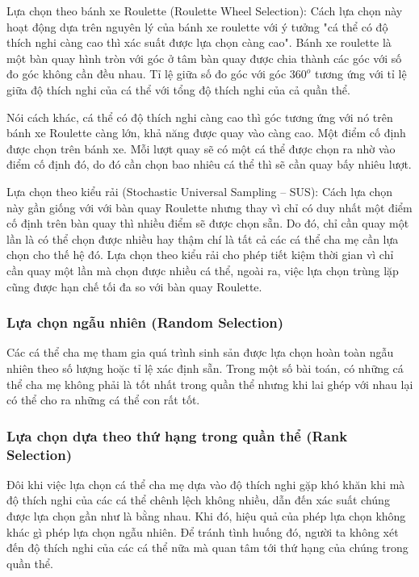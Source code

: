 Lựa chọn theo bánh xe Roulette (Roulette Wheel Selection): Cách lựa chọn này hoạt động dựa trên nguyên lý của bánh xe roulette với ý tưởng "cá thể có độ thích nghi càng cao thì xác suất được lựa chọn càng cao". Bánh xe roulette là một bàn quay hình tròn với góc ở tâm bàn quay được chia thành các góc với số đo góc không cần đều nhau. Tỉ lệ giữa số đo góc với góc $360^o$ tương ứng với tỉ lệ giữa độ thích nghi của cá thể với tổng độ thích nghi của cả quần thể.

Nói cách khác, cá thể có độ thích nghi càng cao thì góc tương ứng với nó trên bánh xe Roulette càng lớn, khả năng được quay vào càng cao. Một điểm cố định được chọn trên bánh xe. Mỗi lượt quay sẽ có một cá thể được chọn ra nhờ vào điểm cố định đó, do đó cần chọn bao nhiêu cá thể thì sẽ cần quay bấy nhiêu lượt.

Lựa chọn theo kiểu rải (Stochastic Universal Sampling – SUS): Cách lựa chọn này gần giống với với bàn quay Roulette nhưng thay vì chỉ có duy nhất một điểm cố định trên bàn quay thì nhiều điểm sẽ được chọn sẵn. Do đó, chỉ cần quay một lần là có thể chọn được nhiều hay thậm chí là tất cả các cá thể cha mẹ cần lựa chọn cho thế hệ đó. Lựa chọn theo kiểu rải cho phép tiết kiệm thời gian vì chỉ cần quay một lần mà chọn được nhiều cá thể, ngoài ra, việc lựa chọn trùng lặp cũng được hạn chế tối đa so với bàn quay Roulette.

\subsubsection{Lựa chọn ngẫu nhiên (Random Selection)}
Các cá thể cha mẹ tham gia quá trình sinh sản được lựa chọn hoàn toàn ngẫu nhiên theo số lượng hoặc tỉ lệ xác định sẵn. Trong một số bài toán, có những cá thể cha mẹ không phải là tốt nhất trong quần thể nhưng khi lai ghép với nhau lại có thể cho ra những cá thể con rất tốt.

\subsubsection{Lựa chọn dựa theo thứ hạng trong quần thể (Rank Selection)}
Đôi khi việc lựa chọn cá thể cha mẹ dựa vào độ thích nghi gặp khó khăn khi mà độ thích nghi của các cá thể chênh lệch không nhiều, dẫn đến xác suất chúng được lựa chọn gần như là bằng nhau. Khi đó, hiệu quả của phép lựa chọn không khác gì phép lựa chọn ngẫu nhiên. Để tránh tình huống đó, người ta không xét đến độ thích nghi của các cá thể nữa mà quan tâm tới thứ hạng của chúng trong quần thể.

